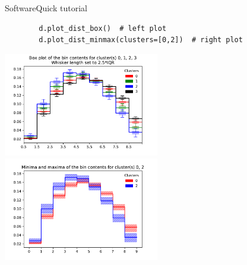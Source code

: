 \begin{frame}[fragile]{Software}{Quick tutorial}
    \begin{verbatim}
        d.plot_dist_box()  # left plot
        d.plot_dist_minmax(clusters=[0,2])  # right plot
    \end{verbatim}
    
    \bigskip
    \begin{changemargin}{-1.2cm}{-1.2cm}
        \includegraphics[width=6.8cm]{figures/plots/box_plot.pdf}\hspace{-0.5cm}
        \includegraphics[width=6.8cm]{figures/plots/plot_minmax_02.pdf}\\
    \end{changemargin}
\end{frame}
